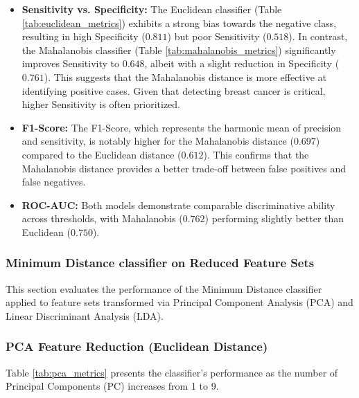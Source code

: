 \documentclass[12pt,a4paper]{article}
\begin{document}
\begin{itemize}
    \item \textbf{Sensitivity vs. Specificity:} The Euclidean classifier (Table \ref{tab:euclidean_metrics}) exhibits a strong bias towards the negative class, resulting in high Specificity ($0.811$) but poor Sensitivity ($0.518$). In contrast, the Mahalanobis classifier (Table \ref{tab:mahalanobis_metrics}) significantly improves Sensitivity to $0.648$, albeit with a slight reduction in Specificity ($0.761$). This suggests that the Mahalanobis distance is more effective at identifying positive cases. Given that detecting breast cancer is critical, higher Sensitivity is often prioritized.
    
    \item \textbf{F1-Score:} The F1-Score, which represents the harmonic mean of precision and sensitivity, is notably higher for the Mahalanobis distance ($0.697$) compared to the Euclidean distance ($0.612$). This confirms that the Mahalanobis distance provides a better trade-off between false positives and false negatives.
    
    \item \textbf{ROC-AUC:} Both models demonstrate comparable discriminative ability across thresholds, with Mahalanobis ($0.762$) performing slightly better than Euclidean ($0.750$).
\end{itemize}


\subsubsection*{Minimum Distance classifier on Reduced Feature Sets}

This section evaluates the performance of the Minimum Distance classifier applied to feature sets transformed via Principal Component Analysis (PCA) and Linear Discriminant Analysis (LDA).

\subsubsection*{PCA Feature Reduction (Euclidean Distance)}

Table \ref{tab:pca_metrics} presents the classifier's performance as the number of Principal Components (PC) increases from 1 to 9.
\end{document}
